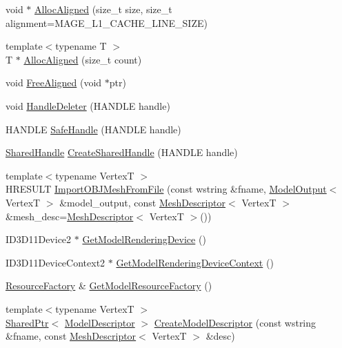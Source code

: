 \begin{DoxyCompactItemize}
void $\ast$ \hyperlink{namespacemage_a4770c97ad241a87982062034adb6c0dc}{Alloc\+Aligned} (size\+\_\+t size, size\+\_\+t alignment=M\+A\+G\+E\+\_\+\+L1\+\_\+\+C\+A\+C\+H\+E\+\_\+\+L\+I\+N\+E\+\_\+\+S\+I\+ZE)
\item 
{\footnotesize template$<$typename T $>$ }\\T $\ast$ \hyperlink{namespacemage_a43e2cdb4c71637a86b1861a73be44a58}{Alloc\+Aligned} (size\+\_\+t count)
\item 
void \hyperlink{namespacemage_a401c54df21447c491c527735647b5f80}{Free\+Aligned} (void $\ast$ptr)
\item 
void \hyperlink{namespacemage_ab8f0b2f46629338cab3de903274f1747}{Handle\+Deleter} (H\+A\+N\+D\+LE handle)
\item 
H\+A\+N\+D\+LE \hyperlink{namespacemage_a80f95ce7eb0d03d5576351663d626b4d}{Safe\+Handle} (H\+A\+N\+D\+LE handle)
\item 
\hyperlink{namespacemage_ab892828913d6129acf71e0cec60467e5}{Shared\+Handle} \hyperlink{namespacemage_a3119898d7caac71d8ee495c3ae3194b1}{Create\+Shared\+Handle} (H\+A\+N\+D\+LE handle)
\item 
{\footnotesize template$<$typename VertexT $>$ }\\H\+R\+E\+S\+U\+LT \hyperlink{namespacemage_acb4aa2ee8f4bb362e8cce1fe22e0adbf}{Import\+O\+B\+J\+Mesh\+From\+File} (const wstring \&fname, \hyperlink{structmage_1_1_model_output}{Model\+Output}$<$ VertexT $>$ \&model\+\_\+output, const \hyperlink{structmage_1_1_mesh_descriptor}{Mesh\+Descriptor}$<$ VertexT $>$ \&mesh\+\_\+desc=\hyperlink{structmage_1_1_mesh_descriptor}{Mesh\+Descriptor}$<$ VertexT $>$())
\item 
I\+D3\+D11\+Device2 $\ast$ \hyperlink{namespacemage_aca16dcb4637f074bb6e33d4ba7929686}{Get\+Model\+Rendering\+Device} ()
\item 
I\+D3\+D11\+Device\+Context2 $\ast$ \hyperlink{namespacemage_a1d373a08e09ec19944bf23feb4688b7e}{Get\+Model\+Rendering\+Device\+Context} ()
\item 
\hyperlink{classmage_1_1_resource_factory}{Resource\+Factory} \& \hyperlink{namespacemage_af3f71027fd2cac8d444bae0335fb8fb2}{Get\+Model\+Resource\+Factory} ()
\item 
{\footnotesize template$<$typename VertexT $>$ }\\\hyperlink{namespacemage_a1e01ae66713838a7a67d30e44c67703e}{Shared\+Ptr}$<$ \hyperlink{classmage_1_1_model_descriptor}{Model\+Descriptor} $>$ \hyperlink{namespacemage_a8cc26f80d3cb6f3d457bb06942880d84}{Create\+Model\+Descriptor} (const wstring \&fname, const \hyperlink{structmage_1_1_mesh_descriptor}{Mesh\+Descriptor}$<$ VertexT $>$ \&desc)

\end{DoxyCompactItemize}

